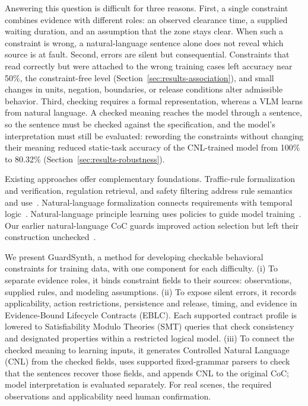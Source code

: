 Answering this question is difficult for three reasons. First, a single constraint combines evidence with different roles: an observed clearance time, a supplied waiting duration, and an assumption that the zone stays clear. When such a constraint is wrong, a natural-language sentence alone does not reveal which source is at fault. Second, errors are silent but consequential. Constraints that read correctly but were attached to the wrong training cases left accuracy near 50\%, the constraint-free level (Section~\ref{sec:results-association}), and small changes in units, negation, boundaries, or release conditions alter admissible behavior. Third, checking requires a formal representation, whereas a VLM learns from natural language. A checked meaning reaches the model through a sentence, so the sentence must be checked against the specification, and the model's interpretation must still be evaluated: rewording the constraints without changing their meaning reduced static-task accuracy of the CNL-trained model from 100\% to 80.32\% (Section~\ref{sec:results-robustness}).\par

Existing approaches offer complementary foundations. Traffic-rule formalization and verification, regulation retrieval, and safety filtering address rule semantics and use~\cite{r6,Wan2024,r7,r19}. Natural-language formalization connects requirements with temporal logic~\cite{r8,r9}. Natural-language principle learning uses policies to guide model training~\cite{Bai2022,Guan2024}. Our earlier natural-language CoC guards improved action selection but left their construction unchecked~\cite{r4}.\par

We present GuardSynth, a method for developing checkable behavioral constraints for training data, with one component for each difficulty. (i) To separate evidence roles, it binds constraint fields to their sources: observations, supplied rules, and modeling assumptions. (ii) To expose silent errors, it records applicability, action restrictions, persistence and release, timing, and evidence in Evidence-Bound Lifecycle Contracts (EBLC). Each supported contract profile is lowered to Satisfiability Modulo Theories (SMT) queries that check consistency and designated properties within a restricted logical model. (iii) To connect the checked meaning to learning inputs, it generates Controlled Natural Language (CNL) from the checked fields, uses supported fixed-grammar parsers to check that the sentences recover those fields, and appends CNL to the original CoC; model interpretation is evaluated separately. For real scenes, the required observations and applicability need human confirmation.\par

